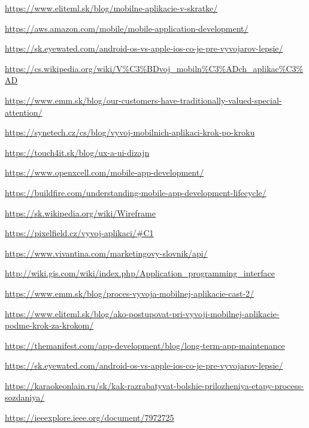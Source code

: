 \documentclass[10pt,twoside,slovak,a4paper]{article}
\begin{document}
\url{https://www.eliteml.sk/blog/mobilne-aplikacie-v-skratke/}

\url{https://aws.amazon.com/mobile/mobile-application-development/}

\url{https://sk.eyewated.com/android-os-vs-apple-ios-co-je-pre-vyvojarov-lepsie/}

\url{https://cs.wikipedia.org/wiki/V\%C3\%BDvoj_mobiln\%C3\%ADch_aplikac\%C3\%AD}

\url{https://www.emm.sk/blog/our-customers-have-traditionally-valued-special-attention/}

\url{https://synetech.cz/cs/blog/vyvoj-mobilnich-aplikaci-krok-po-kroku}

\url{https://touch4it.sk/blog/ux-a-ui-dizajn}

\url{https://www.openxcell.com/mobile-app-development/}

\url{https://buildfire.com/understanding-mobile-app-development-lifecycle/}

\url{https://sk.wikipedia.org/wiki/Wireframe}

\url{https://pixelfield.cz/vyvoj-aplikaci/\#C1}

\url{https://www.vivantina.com/marketingovy-slovnik/api/}

\url{http://wiki.gis.com/wiki/index.php/Application_programming_interface}

\url{https://www.emm.sk/blog/proces-vyvoja-mobilnej-aplikacie-cast-2/}

\url{https://www.eliteml.sk/blog/ako-postupovat-pri-vyvoji-mobilnej-aplikacie-podme-krok-za-krokom/}

\url{https://themanifest.com/app-development/blog/long-term-app-maintenance}

\url{https://sk.eyewated.com/android-os-vs-apple-ios-co-je-pre-vyvojarov-lepsie/}

\url{https://karaokeonlain.ru/sk/kak-razrabatyvat-bolshie-prilozheniya-etapy-process-sozdaniya/}


\url{https://ieeexplore.ieee.org/document/7972725}
%



\end{document}
